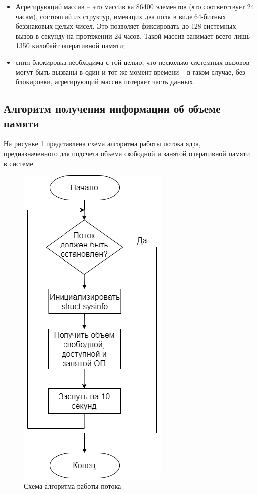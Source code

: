 \newpage

\begin{itemize}
	\item Агрегирующий массив -- это массив на 86400 элементов (что соответствует 24 часам), состоящий из структур, имеющих два поля в виде 64-битных беззнаковых целых чисел. Это позволяет фиксировать до 128 системных вызов в секунду на протяжении 24 часов. Такой массив занимает всего лишь 1350 килобайт оперативной памяти;
	
	\item спин-блокировка необходима с той целью, что несколько системных вызовов могут быть вызваны в один и тот же момент времени -- в таком случае, без блокировки, агрегирующий массив потеряет часть данных.
\end{itemize}

\subsection{Алгоритм получения информации об объеме памяти}

На рисунке \ref{fig:kthread} представлена схема алгоритма работы потока ядра, предназначенного для подсчета объема свободной и занятой оперативной памяти в системе.

\begin{figure}[h!]
	\begin{center}
		\includegraphics[scale=0.5]{jpg/kthread.png}
	\end{center}
	\captionsetup{justification=centering}
	\caption{Схема алгоритма работы потока}
	\label{fig:kthread}
\end{figure}

